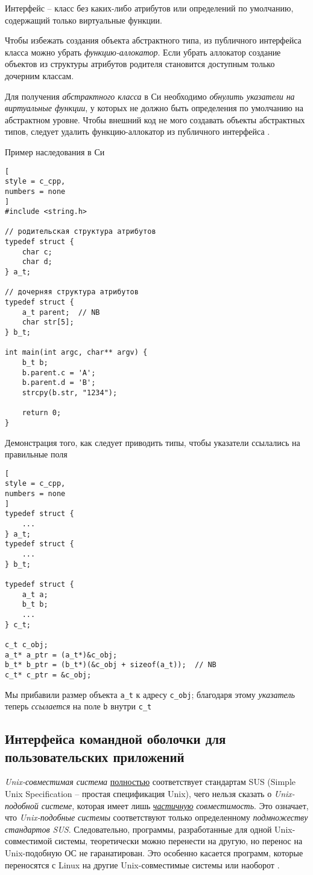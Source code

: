 \documentclass[%
	11pt,
	a4paper,
	utf8,
		]{article}
\begin{document}
Интерфейс -- класс без каких-либо атрибутов или определений по умолчанию, содержащий только виртуальные функции.

Чтобы избежать создания объекта абстрактного типа, из публичного интерфейса класса можно убрать \emph{функцию-аллокатор}. Если убрать аллокатор создание объектов из структуры атрибутов родителя становится доступным только дочерним классам.

Для получения \emph{абстрактного класса} в Си необходимо \emph{обнулить указатели на виртуальные функции}, у которых не должно быть определения по умолчанию на абстрактном уровне. Чтобы внешний код не мого создавать объекты абстрактных типов, следует удалить функцию-аллокатор из публичного интерфейса \cite[]{amini-extreme-c:2022}.

Пример наследования в Си
\begin{lstlisting}[
style = c_cpp,
numbers = none
]
#include <string.h>

// родительская структура атрибутов
typedef struct {
    char c;
    char d;
} a_t;

// дочерняя структура атрибутов
typedef struct {
    a_t parent;  // NB
    char str[5];
} b_t;

int main(int argc, char** argv) {
    b_t b;
    b.parent.c = 'A';
    b.parent.d = 'B';
    strcpy(b.str, "1234");
    
    return 0;
}
\end{lstlisting}

Демонстрация того, как следует приводить типы, чтобы указатели ссылались на правильные поля
\begin{lstlisting}[
style = c_cpp,
numbers = none
]
typedef struct {
    ...
} a_t;
typedef struct {
    ...
} b_t;

typedef struct {
    a_t a;
    b_t b;
    ...
} c_t;

c_t c_obj;
a_t* a_ptr = (a_t*)&c_obj;
b_t* b_ptr = (b_t*)(&c_obj + sizeof(a_t));  // NB
c_t* c_ptr = &c_obj;
\end{lstlisting}

Мы прибавили размер объекта \verb|a_t| к адресу \verb|c_obj|; благодаря этому \emph{указатель} теперь \emph{ссылается} на поле \verb|b| внутри \verb|c_t|

\subsection{Интерфейса командной оболочки для пользовательских приложений}

\emph{Unix-совместимая система} \underline{полностью} соответствует стандартам SUS (Simple Unix Specification -- простая спецификация Unix), чего нельзя сказать о \emph{Unix-подобной системе}, которая имеет лишь \underline{\itshape частичную} \emph{совместимость}. Это означает, что \emph{Unix-подобные системы} соответствуют только определенному \emph{подмножеству стандартов SUS}. Следовательно, программы, разработанные для одной Unix-совместимой системы, теоретически можно перенести на другую, но перенос на Unix-подобную ОС не гаранатирован. Это особенно касается программ, которые переносятся с Linux на другие Unix-совместимые системы или наоборот \cite[]{amini-extreme-c:2022}.
\end{document}

